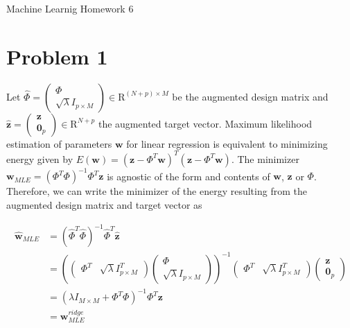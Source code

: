 \documentclass[12pt]{article}
\begin{document}
\begin{center}
{\Large Machine Learnig Homework 6} \\[.3in]
\end{center}
\vspace*{.5in}



\section*{Problem 1}

Let $\hat{\Phi} = \begin{pmatrix} \Phi \\ \sqrt{\lambda}I_{p \times M} \end{pmatrix} \in \mathrm{R}^{(N+p) \times M}$ be the augmented design matrix and $\hat{\mathbf{z}} = \begin{pmatrix} \mathbf{z} \\ \mathbf{0}_p \end{pmatrix} \in \mathrm{R}^{N+p}$ the augmented target vector. Maximum likelihood estimation of parameters $ \mathbf{w}$ for linear regression is equivalent to minimizing energy given by $E(\mathbf{w}) = (\mathbf{z} - \Phi^T\mathbf{w})^T(\mathbf{z} - \Phi^T\mathbf{w})$. The minimizer $\mathbf{w}_{MLE} = (\Phi^T\Phi)^{-1}\Phi^T\mathbf{z}$ is agnostic of the form and contents of $\mathbf{w}$, $\mathbf{z}$ or $\Phi$. Therefore, we can write the minimizer of the energy resulting from the augmented design matrix and target vector as 

\begin{align}
 \hat{\mathbf{w}}_{MLE} &= (\hat{\Phi}^T\hat{\Phi})^{-1}\hat{\Phi}^T\hat{\mathbf{z}} \\
	       &= \left( \begin{pmatrix} \Phi^T & \sqrt{\lambda}I_{p \times M}^T \end{pmatrix} \begin{pmatrix} \Phi \\ \sqrt{\lambda}I_{p \times M} \end{pmatrix} \right)^{-1} \begin{pmatrix} \Phi^T & \sqrt{\lambda}I_{p \times M}^T \end{pmatrix} \begin{pmatrix} \mathbf{z} \\ \mathbf{0}_p \end{pmatrix} \\
	       &= \left( \lambda I_{M \times M} + \Phi^T\Phi \right)^{-1} \Phi^T \mathbf{z} \\
	       &= \mathbf{w}_{MLE}^{ridge}
\end{align}
\end{document}
